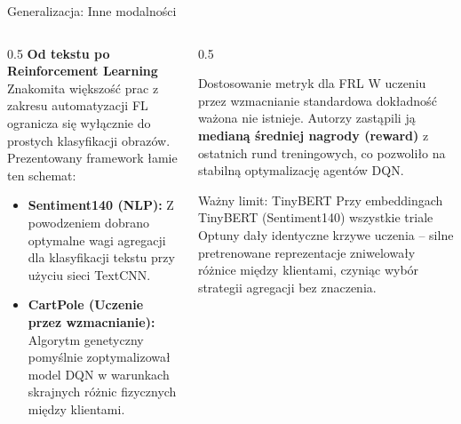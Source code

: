 \documentclass[9pt,aspectratio=169]{beamer}
\begin{document}
\begin{frame}{Generalizacja: Inne modalności}
\begin{columns}[T]
\begin{column}{0.5\textwidth}
\textbf{Od tekstu po Reinforcement Learning}\\[4pt]
Znakomita większość prac z zakresu automatyzacji FL ogranicza się wyłącznie do prostych klasyfikacji obrazów. Prezentowany framework łamie ten schemat:
\begin{itemize}\footnotesize
\item \textbf{Sentiment140 (NLP):} Z powodzeniem dobrano optymalne wagi agregacji dla klasyfikacji tekstu przy użyciu sieci TextCNN.
\item \textbf{CartPole (Uczenie przez wzmacnianie):} Algorytm genetyczny pomyślnie zoptymalizował model DQN w warunkach skrajnych różnic fizycznych między klientami.
\end{itemize}
\end{column}
\begin{column}{0.5\textwidth}
{\footnotesize
\begin{infoboxgreen}{Dostosowanie metryk dla FRL}
W uczeniu przez wzmacnianie standardowa dokładność ważona nie istnieje. Autorzy zastąpili ją \textbf{medianą średniej nagrody (reward)} z ostatnich rund treningowych, co pozwoliło na stabilną optymalizację agentów DQN.
\end{infoboxgreen}
\vspace{2pt}
\begin{infoboxorange}{Ważny limit: TinyBERT}
Przy embeddingach TinyBERT (Sentiment140) wszystkie triale Optuny dały identyczne krzywe uczenia -- silne pretrenowane reprezentacje zniwelowały różnice między klientami, czyniąc wybór strategii agregacji bez znaczenia.
\end{infoboxorange}}
\end{column}
\end{columns}
\end{frame}
\end{document}
